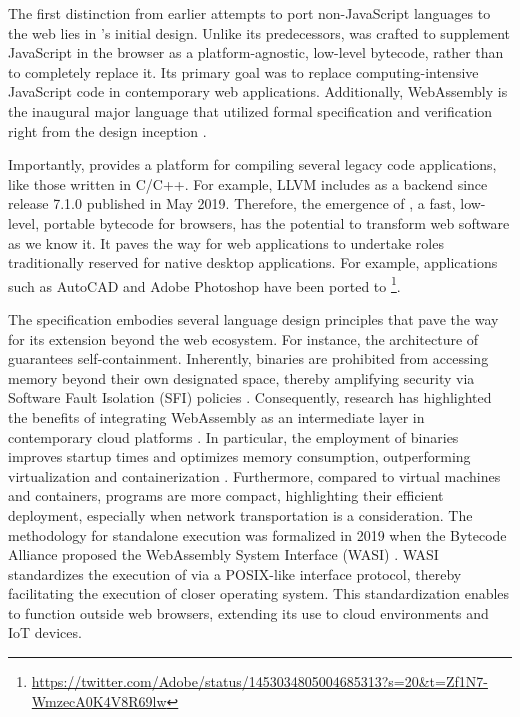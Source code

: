 The first distinction from earlier attempts to port non-JavaScript languages to the web lies in \Wasm's initial design. 
Unlike its predecessors, \Wasm was crafted to supplement JavaScript in the browser as a platform-agnostic, low-level bytecode, rather than to completely replace it. 
Its primary goal was to replace computing-intensive JavaScript code in contemporary web applications. 
Additionally, WebAssembly is the inaugural major language that utilized formal specification and verification right from the design inception \cite{Haas_2017, watt2018mechanising}. 


Importantly, \Wasm provides a platform for compiling several legacy code applications, like those written in C/C++. 
For example, LLVM includes \Wasm  as a backend since release 7.1.0 published in May 2019.
Therefore, the emergence of \Wasm, a fast, low-level, portable bytecode for browsers, has the potential to transform web software as we know it. 
It paves the way for web applications to undertake roles traditionally reserved for native desktop applications.
For example, applications such as AutoCAD and Adobe Photoshop have been ported to \Wasm \footnote{\url{https://twitter.com/Adobe/status/1453034805004685313?s=20&t=Zf1N7-WmzecA0K4V8R69lw}}. 


The \Wasm specification embodies several language design principles that pave the way for its extension beyond the web ecosystem.
For instance, the architecture of \Wasm guarantees self-containment.
Inherently, \Wasm binaries are prohibited from accessing memory beyond their own designated space, thereby amplifying security via Software Fault Isolation (SFI)  policies \cite{10.1145/3498688}.
Consequently, research has highlighted the benefits of integrating WebAssembly as an intermediate layer in contemporary cloud platforms \cite{pMendkiServerless}.
In particular, the employment of \Wasm binaries improves startup times and optimizes memory consumption, outperforming virtualization and containerization \cite{1244493Jacobsson}.
Furthermore, compared to virtual machines and containers, \Wasm programs are more compact, highlighting their efficient deployment, especially when network transportation is a consideration.
The methodology for standalone \Wasm execution was formalized in 2019 when the Bytecode Alliance proposed the WebAssembly System Interface (WASI) .
WASI standardizes the execution of \Wasm via a POSIX-like interface protocol, thereby facilitating the execution of \Wasm closer operating system.
This standardization enables \Wasm to function outside web browsers, extending its use to cloud environments and IoT devices.

